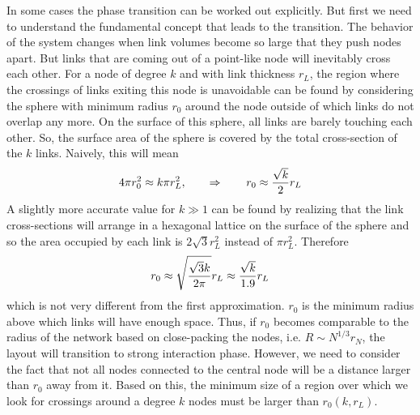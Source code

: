 \documentclass[linenumbers,endfloats,nofootinbib,preprint,floatfix,titlepage,superscriptaddress]{revtex4-1} %
\begin{document}
In some cases the phase transition can be worked out explicitly. 
But first we need to understand the fundamental concept that leads to the transition. 
The behavior of the system changes when link volumes become so large that they push nodes apart. 
But links that are coming out of a point-like node will inevitably cross each other. 
For a node of degree $k$ and with link thickness $r_L$, the region where the crossings of links exiting this node is unavoidable can be found by considering the sphere with minimum radius $r_0$ around the node outside of which links do not overlap any more. 
On the surface of this sphere, all links are barely touching each other. 
So, the surface area of the sphere is covered by the total cross-section of the $k$ links. 
Naively, this will mean 
\[4\pi r_0^2 \approx k \pi r_L^2,\qquad \Rightarrow \qquad r_0 \approx {\sqrt{k}\over 2} r_L  \]
A slightly more accurate value for $k\gg 1$ can be found by realizing that the link cross-sections will arrange in a hexagonal lattice on the surface of the sphere and so the area occupied by each link is $2\sqrt{3} r_L^2$ instead of $\pi r_L^2$. 
Therefore
\[r_0 \approx  \sqrt{{ \sqrt{3} k \over 2\pi }} r_L \approx {\sqrt{k}\over 1.9 } r_L\]
which is not very different from the first approximation. 
$r_0$ is the minimum radius above which links will have enough space. 
Thus, if $r_0$ becomes comparable to the radius of the network based on close-packing the nodes, i.e. $R\sim N^{1/3} r_N$, the layout will transition to strong interaction phase. 
However, we need to consider the fact that not all nodes connected to the central node will be a distance larger than $r_0$ away from it. 
Based on this, the minimum size of a region over which we look for crossings around a degree $k$ nodes must be larger than $r_0(k,r_L)$.
\end{document}
